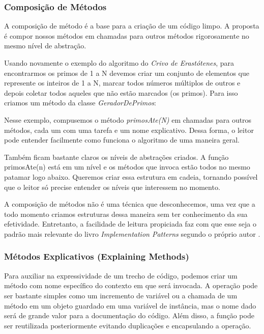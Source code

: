 \subsubsection{Composição de Métodos}
\label{metodos:composicao}
A composição de método é a base para a criação de um código limpo. A proposta é compor nossos métodos em chamadas para outros métodos rigorosamente no mesmo nível de abstração.
	
Usando novamente o exemplo do algoritmo do \textit{Crivo de Erastótenes}, para encontrarmos os primos de 1 a N devemos criar um conjunto de elementos que represente os inteiros de 1 a N, marcar todos números múltiplos de outros e depois coletar todos aqueles que não estão marcados (os primos). Para isso criamos um método da classe \textit{GeradorDePrimos}:



Nesse exemplo, compusemos o método \textit{primosAte(N)} em chamadas para outros métodos, cada um com uma tarefa e um nome explicativo. Dessa forma, o leitor pode entender facilmente como funciona o algoritmo de uma maneira geral. 
	
Também ficam bastante claros os níveis de abstrações criados. A função primosAte(n) está em um nível e os métodos que invoca estão todos no mesmo patamar logo abaixo. Queremos criar essa estrutura em cadeia, tornando possível que o leitor só precise entender os níveis que interessem no momento.
	
A composição de métodos não é uma técnica que desconhecemos, uma vez que a todo momento criamos estruturas dessa maneira sem ter conhecimento da sua efetividade. Entretanto, a facilidade de leitura propiciada faz com que esse seja o padrão mais relevante do livro \textit{Implementation Patterns} segundo o próprio autor \citep{Beck2007, InfoQ2008}.

\subsubsection{Métodos Explicativos (Explaining Methods)}
\label{metodos:explicativos}
Para auxiliar na expressividade de um trecho de código, podemos criar um método com nome específico do contexto em que será invocada. A operação pode ser bastante simples como um incremento de variável ou a chamada de um método em um objeto guardado em uma variável de instância, mas o nome dado será de grande valor para a documentação do código. Além disso, a função pode ser reutilizada posteriormente evitando duplicações e encapsulando a operação.
	
